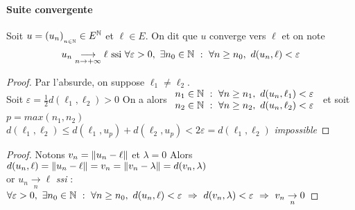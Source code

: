 		\vspace{-15pt}
		\traitd 
		\paragraph{Suite convergente}	
			Soit $u=\left( u_n\right)_{_{n\in{\mathbb{N}}}} \in E^{{\mathbb{N}}}$ et $\ell\in E$.
			On dit que $u$ converge vers $\ell$ et on note 
			\[
				u_n \underset{n\rightarrow +\infty}{\longrightarrow} \ell ~\mathrm{ssi}~\forall 
				\varepsilon >0 ,~\exists n_0 \in \N ~:~ \forall n\geq n_0,~d(u_n ,\ell) <\varepsilon
			\vspace{-15pt}
			\] 
		\trait 
			
			
		\begin{proof}
			Par l'absurde, on suppose $\ell_1\neq \ell_2$.\\
			Soit $\varepsilon = \frac{1}{2} d(\ell_1,\ell_2) >0$
			On a alors $\begin{array}{l} n_1 \in {\mathbb{N}} ~:~\forall n\geq n_1 ,~d(u_n,\ell_1) < \varepsilon \\  
			n_2 \in {\mathbb{N}} ~:~\forall n\geq n_2 ,~d(u_n,\ell_2) < \varepsilon \end{array} $  et soit $p=max(n_1,n_2)$ \vspace*{0.1cm}\\
			$d(\ell_1,\ell_2) \leq d(\ell_1,u_p) + d(\ell_2,u_p) < 2\varepsilon = d(\ell_1,\ell_2)$  \emph{impossible}
		\end{proof} \medskip
		
		
		\begin{proof}
			Notons $v_n = \left\Vert u_n-\ell \right\Vert$ et $\lambda = 0$
			Alors $d(u_n,\ell) = \left\Vert u_n - \ell \right\Vert = v_n = \left\Vert v_n - \lambda \right\Vert = d(v_n,\lambda )$ \\
			or $u_n \underset{n}{\rightarrow} \ell$ \emph{ssi} : $\forall \varepsilon >0 ,~\exists n_0 \in {\mathbb{N}} ~:~ 
			\forall n\geq n_0,~d(u_n ,\ell) <\varepsilon ~\Rightarrow ~ d(v_n,\lambda)<\varepsilon ~\Rightarrow ~ v_n \underset{n}{\rightarrow} 0$
		\end{proof} \medskip

